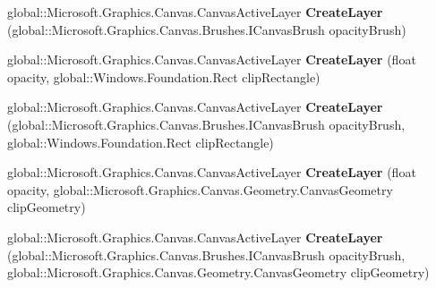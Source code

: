 \begin{DoxyCompactItemize}
\mbox{\label{interface_microsoft_1_1_graphics_1_1_canvas_1_1_i_canvas_drawing_session_a20701590f19d65d6980d108dfc7a2e19}} 
global\+::\+Microsoft.\+Graphics.\+Canvas.\+Canvas\+Active\+Layer {\bfseries Create\+Layer} (global\+::\+Microsoft.\+Graphics.\+Canvas.\+Brushes.\+I\+Canvas\+Brush opacity\+Brush)
\item 
\mbox{\label{interface_microsoft_1_1_graphics_1_1_canvas_1_1_i_canvas_drawing_session_a7bc31c638ab7c078564b2ba851ac2487}} 
global\+::\+Microsoft.\+Graphics.\+Canvas.\+Canvas\+Active\+Layer {\bfseries Create\+Layer} (float opacity, global\+::\+Windows.\+Foundation.\+Rect clip\+Rectangle)
\item 
\mbox{\label{interface_microsoft_1_1_graphics_1_1_canvas_1_1_i_canvas_drawing_session_af8fe4d3bfd7c8f1e636ea08505d1db2c}} 
global\+::\+Microsoft.\+Graphics.\+Canvas.\+Canvas\+Active\+Layer {\bfseries Create\+Layer} (global\+::\+Microsoft.\+Graphics.\+Canvas.\+Brushes.\+I\+Canvas\+Brush opacity\+Brush, global\+::\+Windows.\+Foundation.\+Rect clip\+Rectangle)
\item 
\mbox{\label{interface_microsoft_1_1_graphics_1_1_canvas_1_1_i_canvas_drawing_session_a3bbbcb2cdd79faaa6670d8ba3144611e}} 
global\+::\+Microsoft.\+Graphics.\+Canvas.\+Canvas\+Active\+Layer {\bfseries Create\+Layer} (float opacity, global\+::\+Microsoft.\+Graphics.\+Canvas.\+Geometry.\+Canvas\+Geometry clip\+Geometry)
\item 
\mbox{\label{interface_microsoft_1_1_graphics_1_1_canvas_1_1_i_canvas_drawing_session_a18667b1e3c095941bd2e4afcfb66ff4a}} 
global\+::\+Microsoft.\+Graphics.\+Canvas.\+Canvas\+Active\+Layer {\bfseries Create\+Layer} (global\+::\+Microsoft.\+Graphics.\+Canvas.\+Brushes.\+I\+Canvas\+Brush opacity\+Brush, global\+::\+Microsoft.\+Graphics.\+Canvas.\+Geometry.\+Canvas\+Geometry clip\+Geometry)
\item 
\mbox{\label{interface_microsoft_1_1_graphics_1_1_canvas_1_1_i_canvas_drawing_session_a502cde9c65a5fe437090c3ffdd7194b2}} 

\end{DoxyCompactItemize}

